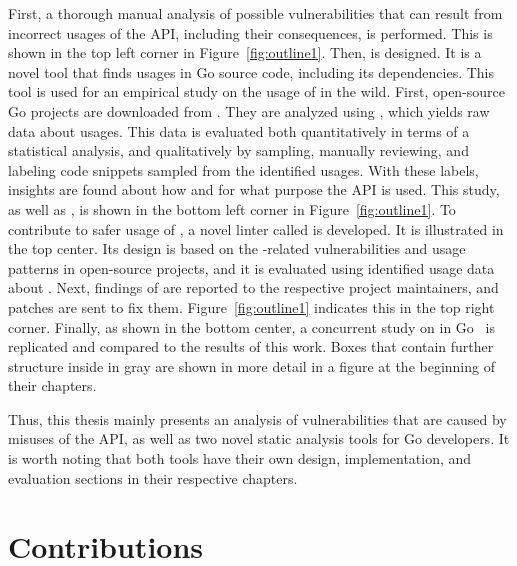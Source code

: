 

First, a thorough manual analysis of possible vulnerabilities that can result from incorrect usages of the \unsafe{}
\acrshort{API}, including their consequences, is performed.
This is shown in the top left corner in Figure~\ref{fig:outline1}.
Then, \toolGeiger{} is designed.
It is a novel tool that finds \unsafe{} usages in Go source code, including its dependencies.
This tool is used for an empirical study on the usage of \unsafe{} in the wild.
First, open-source Go projects are downloaded from \github{}.
They are analyzed using \toolGeiger{}, which yields raw data about \unsafe{} usages.
This data is evaluated both quantitatively in terms of a statistical analysis, and qualitatively by sampling,
manually reviewing, and labeling code snippets sampled from the identified \unsafe{} usages.
With these labels, insights are found about how and for what purpose the \unsafe{} \acrshort{API} is used.
This study, as well as \toolGeiger{}, is shown in the bottom left corner in Figure~\ref{fig:outline1}.
To contribute to safer usage of \unsafe{}, a novel linter called \toolSafer{} is developed.
It is illustrated in the top center.
Its design is based on the \unsafe{}-related vulnerabilities and \unsafe{} usage patterns in open-source projects,
and it is evaluated using identified usage data about \unsafe{}.
Next, findings of \toolSafer{} are reported to the respective project maintainers, and patches are sent to fix them.
Figure~\ref{fig:outline1} indicates this in the top right corner.
Finally, as shown in the bottom center, a concurrent study on \unsafe{} in Go~\cite{costa2020} is replicated and
compared to the results of this work.
Boxes that contain further structure inside in gray are shown in more detail in a figure at the beginning of their
chapters.

Thus, this thesis mainly presents an analysis of vulnerabilities that are caused by misuses of the \unsafe{}
\acrshort{API}, as well as two novel static analysis tools for Go developers.
It is worth noting that both tools have their own design, implementation, and evaluation sections in their respective
chapters.



\section{Contributions}\label{sec:introduction:contributions}


